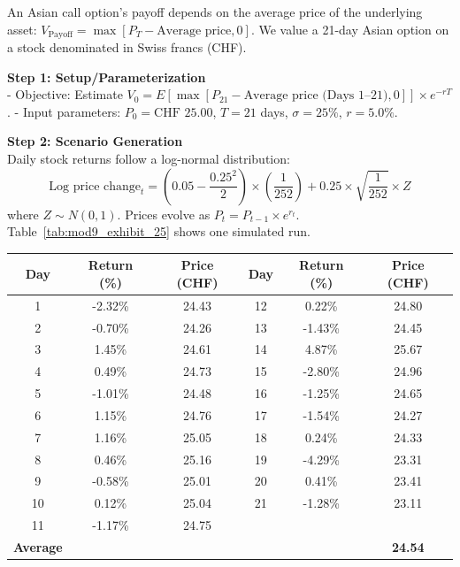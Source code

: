 \begin{tcolorbox}[
	colback=gray!5!white,
	colframe=black!15!white,
	boxrule=0.5pt,
	arc=3pt,
	title=\textbf{Case Study: Asian Option Valuation Using Monte Carlo Simulation},
	coltitle=black,
	colbacktitle=black!5!white,
	before skip=6pt,
	after skip=6pt,
	breakable
]
An Asian call option's payoff depends on the average price of the underlying asset: $V_{\text{Payoff}} = \max[P_T - \text{Average price}, 0]$. We value a 21-day Asian option on a stock denominated in Swiss francs (CHF).

\textbf{Step 1: Setup/Parameterization} \\
- Objective: Estimate $V_0 = E[\max[P_{21} - \text{Average price (Days 1--21)}, 0]] \times e^{-rT}$.
- Input parameters: $P_0 = \text{CHF } 25.00$, $T = 21$ days, $\sigma = 25\%$, $r = 5.0\%$.

\textbf{Step 2: Scenario Generation} \\
Daily stock returns follow a log-normal distribution:
\[
	\text{Log price change}_t = \left(0.05 - \frac{0.25^2}{2}\right) \times \left(\frac{1}{252}\right) + 0.25 \times \sqrt{\frac{1}{252}} \times Z
\]
where $Z \sim N(0, 1)$. Prices evolve as $P_t = P_{t-1} \times e^{r_t}$. Table~\ref{tab:mod9_exhibit_25} shows one simulated run.

\begin{center}
\centering
{}
\label{tab:mod9_exhibit_25}
\begin{tabular}{c c c | c c c}
	\toprule
	\textbf{Day} & \textbf{Return (\%)} & \textbf{Price (CHF)} & \textbf{Day} & \textbf{Return (\%)} & \textbf{Price (CHF)} \\
	\midrule
	1 & -2.32\% & 24.43 & 12 & 0.22\% & 24.80 \\
	2 & -0.70\% & 24.26 & 13 & -1.43\% & 24.45 \\
	3 & 1.45\% & 24.61 & 14 & 4.87\% & 25.67 \\
	4 & 0.49\% & 24.73 & 15 & -2.80\% & 24.96 \\
	5 & -1.01\% & 24.48 & 16 & -1.25\% & 24.65 \\
	6 & 1.15\% & 24.76 & 17 & -1.54\% & 24.27 \\
	7 & 1.16\% & 25.05 & 18 & 0.24\% & 24.33 \\
	8 & 0.46\% & 25.16 & 19 & -4.29\% & 23.31 \\
	9 & -0.58\% & 25.01 & 20 & 0.41\% & 23.41 \\
	10 & 0.12\% & 25.04 & 21 & -1.28\% & 23.11 \\
	11 & -1.17\% & 24.75 & & & \\
	\midrule
	\textbf{Average} & & & & & \textbf{24.54} \\
	\bottomrule
\end{tabular}
\end{center}


\end{tcolorbox}
